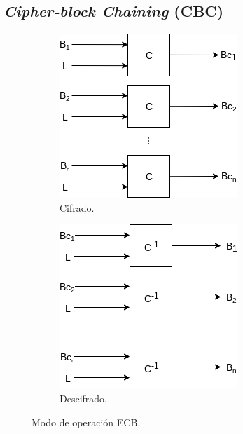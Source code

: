\subsection{\textit{Cipher-block Chaining} (CBC)}

\begin{figure}[H]
  \centering
  \begin{subfigure}{0.45\textwidth}
      \begin{center}
          \includegraphics[width=0.7\linewidth]
            {contenidos/antecedentes/diagramas/modo_ecb.png}
          \caption{Cifrado.}
      \end{center}
  \end{subfigure}
  \begin{subfigure}{0.45\textwidth}
      \begin{center}
          \includegraphics[width=0.7\linewidth]
            {contenidos/antecedentes/diagramas/modo_ecb_inverso.png}
          \caption{Descifrado.}
      \end{center}
  \end{subfigure}
  \caption{Modo de operación ECB.}
\end{figure}


